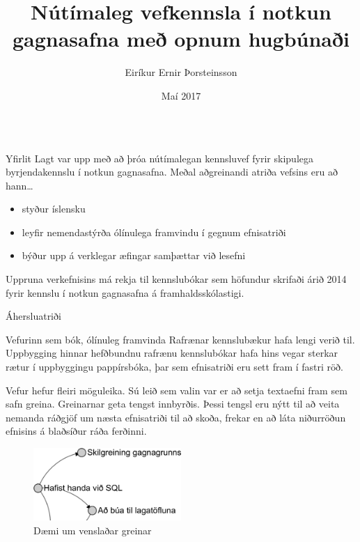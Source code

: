 \documentclass[final]{beamer}
\title{Nútímaleg vefkennsla í notkun gagnasafna með opnum hugbúnaði}
\author{Eiríkur Ernir Þorsteinsson}
\institute{Iðnaðarverkfræði-, vélaverkfræði- og tölvunarfræðideild}
\date{Maí 2017}
\begin{document}
\begin{frame}
\begin{tcolorbox}[standard jigsaw, height=97cm, colframe=orange, opacityback=0, sharp corners=all]
\begin{columns}[t]

\begin{column}{.47\linewidth}

\begin{block}{Yfirlit}
    Lagt var upp með að þróa nútímalegan kennsluvef fyrir skipulega byrjendakennslu í notkun gagnasafna. Meðal aðgreinandi atriða vefsins eru að hann\ldots
    \begin{itemize}
        \item styður íslensku
        \item leyfir nemendastýrða ólínulega framvindu í gegnum efnisatriði
        \item býður upp á verklegar æfingar samþættar við lesefni
    \end{itemize}
    Uppruna verkefnisins má rekja til kennslubókar sem höfundur skrifaði árið 2014 fyrir kennslu í notkun gagnasafna á framhaldsskólastigi. 
\end{block}

\begin{block}{Áhersluatriði}

    \begin{subblock}{Vefurinn sem bók, ólínuleg framvinda} 
        Rafrænar kennslubækur hafa lengi verið til. Uppbygging hinnar hefðbundnu rafrænu kennslubókar hafa hins vegar sterkar rætur í uppbyggingu pappírsbóka, þar sem efnisatriði eru sett fram í fastri röð.

        Vefur hefur fleiri möguleika. Sú leið sem valin var er að setja textaefni fram sem safn greina. 
        Greinarnar geta tengst innbyrðis. Þessi tengsl eru nýtt til að veita nemanda ráðgjöf um næsta efnisatriði til að skoða, frekar en að láta niðurröðun efnisins á blaðsíður ráða ferðinni.
        \begin{figure}
            \caption{Dæmi um venslaðar greinar}
            \includegraphics[width=0.5\textwidth]{relational-sections}
        \end{figure}
    \end{subblock}


\end{block}
\end{column}
\end{columns}
\end{tcolorbox}
\end{frame}
\end{document}
